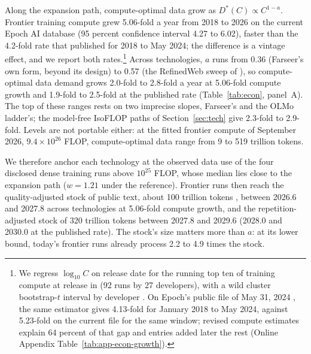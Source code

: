 Along the expansion path, compute-optimal data grow as $D^*(C)\propto C^{1-a}$. Frontier training compute grew
5.06-fold a year from 2018 to 2026 on the current Epoch AI database (95 percent confidence interval 4.27 to 6.02),
faster than the 4.2-fold rate that \citet{sevilla2024training} published for 2018 to May 2024; the difference is a
vintage effect, and we report both rates.\footnote{We regress $\log_{10}C$ on release date for the running top ten of training compute at release in \citet{epochai2026data} (92 runs by 27 developers), with a wild
cluster bootstrap-$t$ interval by developer \citep{webb2023reworking}. On Epoch's public file of May 31, 2024
\citep{epochai2024dataarchive}, the same estimator gives 4.13-fold for January 2018 to May 2024, against 5.23-fold on
the current file for the same window; revised compute estimates explain 64 percent of that gap and entries added later
the rest (Online Appendix Table~\ref{tab:app-econ-growth}).} Across technologies, $a$ runs from 0.36 (Farseer's own
form, beyond its design) to 0.57 (the RefinedWeb sweep of \citealt{gadre2024language}), so compute-optimal data demand
grows 2.0-fold to 2.8-fold a year at 5.06-fold compute growth and 1.9-fold to 2.5-fold at the published rate
(Table~\ref{tab:econ}, panel~A). The top of these ranges rests on two imprecise slopes, Farseer's and the OLMo
ladder's; the model-free IsoFLOP paths of Section~\ref{sec:tech} give 2.3-fold to 2.9-fold. Levels are not portable
either: at the fitted frontier compute of September 2026, $9.4\times10^{26}$ FLOP, compute-optimal data range from 9
to 519 trillion tokens.

We therefore anchor each technology at the observed data use of the four disclosed dense training runs above $10^{25}$
FLOP, whose median lies close to the expansion path ($w=1.21$ under the reference). Frontier runs then reach the
quality-adjusted stock of public text, about 100 trillion tokens \citep{villalobos2022run}, between 2026.6 and 2027.8
across technologies at 5.06-fold compute growth, and the repetition-adjusted stock of 320 trillion tokens between 2027.8
and 2029.6 (2028.0 and 2030.0 at the published rate). The stock's size matters more than $a$: at its lower bound,
today's frontier runs already process 2.2 to 4.9 times the stock.

